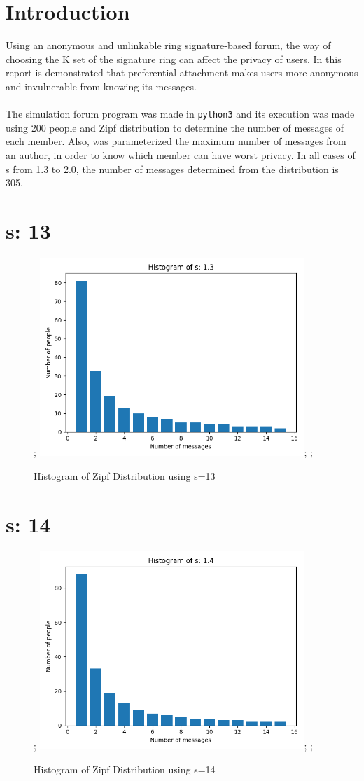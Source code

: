 \documentclass{article}
\begin{document}
\section{Introduction}
Using an anonymous and unlinkable ring signature-based forum, the way of choosing the K set of the signature ring can affect the privacy of users.
In this report is demonstrated that preferential attachment makes users more anonymous and invulnerable from knowing its messages.\\
\\
The simulation forum program was made in \texttt{python3} and its execution was made using 200 people and Zipf distribution to determine the number of messages of each member. Also, was parameterized the maximum number of messages from an author, in order to know which member can have worst privacy. In all cases of s from 1.3 to 2.0, the number of messages determined from the distribution is 305.  
\section{s: 13}
\begin{figure}[H] \centering; \includegraphics[width=10cm]{imgs/histogram-13.png}; \label{fig:hist-13}; \caption{Histogram of Zipf Distribution using s=13} \end{figure}




\section{s: 14}
\begin{figure}[H] \centering; \includegraphics[width=10cm]{imgs/histogram-14.png}; \label{fig:hist-14}; \caption{Histogram of Zipf Distribution using s=14} \end{figure}


\end{document}
